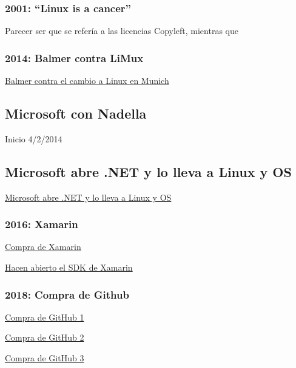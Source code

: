 \documentclass[10pt, titlepage]{article}
\begin{document}
\subsubsection{2001: ``Linux is a cancer''}
Parecer ser que se refería a las licencias Copyleft, mientras que 

\subsubsection{2014: Balmer contra LiMux}
 \href{https://www.muycomputer.com/2014/05/16/linux-en-munich/}{Balmer contra el cambio a Linux en Munich}

\subsection{Microsoft con Nadella}

Inicio 4/2/2014

\subsection{Microsoft abre .NET y lo lleva a Linux y OS}
\href{https://arstechnica.com/information-technology/2014/11/microsoft-open-sources-net-takes-it-to-linux-and-os-x/}{Microsoft abre .NET y lo lleva a Linux y OS}

\subsubsection{2016: Xamarin}
\href{https://www.genbeta.com/desarrollo/microsoft-adquiere-xamarin}{Compra de Xamarin}

\href{https://www.petri.com/microsofts-newly-acquired-xamarin-expands-developer-tools-new-features}{Hacen abierto el SDK de Xamarin}

\subsubsection{2018: Compra de Github}
\href{https://www.xataka.com/aplicaciones/oficial-microsoft-compra-github-7-500-millones-dolares}{Compra de GitHub 1}

\href{https://www.elconfidencial.com/tecnologia/2018-06-04/microsoft-ahora-ama-el-software-libre-compra-la-startup-github-por-7-500-millones_1573704/}{Compra de GitHub 2}

\href{https://www.xataka.com/aplicaciones/microsoft-punto-adquirir-github-desarrolladores-desarrolladores-desarrolladores}{Compra de GitHub 3}
\end{document}
